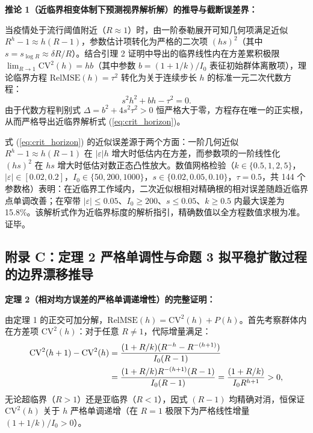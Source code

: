 \documentclass[11pt,a4paper]{article}
\theoremstyle{plain}
\theoremstyle{definition}
\begin{document}
\vspace{0.8em}
\noindent\textbf{推论 1（近临界相变体制下预测视界解析解）的推导与截断误差界：}

当疫情处于流行阈值附近（$R \approx 1$）时，由一阶泰勒展开可知几何项满足近似 $R^h - 1 \approx h(R-1)$，参数估计项转化为严格的二次项 $(h s)^2$（其中 $s = s_{\log R} \approx \delta R / R$）。结合引理 2 证明中导出的临界线性内在方差累积极限 $\lim_{R\to 1}\text{CV}^2(h) = h b$（其中参数 $b=(1+1/k)/I_0$ 表征初始群体离散项），理论临界方程 $\text{RelMSE}(h) = \tau^2$ 转化为关于连续步长 $h$ 的标准一元二次代数方程：
\begin{equation}
s^2 h^2 + b h - \tau^2 = 0.
\end{equation}
由于代数方程判别式 $\Delta = b^2 + 4 s^2 \tau^2 > 0$ 恒严格大于零，方程存在唯一的正实根，从而严格导出近临界解析式 (\ref{eq:crit_horizon})。

式 (\ref{eq:crit_horizon}) 的近似误差源于两个方面：一阶几何近似 $R^h - 1 \approx h(R-1)$ 在 $|\varepsilon| h$ 增大时低估内在方差，而参数项的一阶线性化 $(h s)^2$ 在 $h s$ 增大时低估对数正态凸性放大。数值网格检验（$k \in \{0.5, 1, 2, 5\}$，$|\varepsilon| \in [0.02, 0.2]$，$I_0 \in \{50, 200, 1000\}$，$s \in \{0.02, 0.05, 0.10\}$，$\tau = 0.5$，共 144 个参数格）表明：在近临界工作域内，二次近似根相对精确根的相对误差随趋近临界点单调改善；在窄带 $|\varepsilon| \le 0.05$、$I_0 \ge 200$、$s \le 0.05$、$k \ge 0.5$ 内最大误差为 15.8\%。该解析式作为近临界标度的解析指引，精确数值以全方程数值求根为准。
证毕。

\subsection*{附录 C：定理 2 严格单调性与命题 3 拟平稳扩散过程的边界漂移推导}

\noindent\textbf{定理 2（相对均方误差的严格单调递增性）的完整证明：}

由定理 1 的正交可加分解，$\text{RelMSE}(h) = \text{CV}^2(h) + P(h)$。首先考察群体内在方差项 $\text{CV}^2(h)$：对于任意 $R \neq 1$，代际增量满足：
\begin{align}
\text{CV}^2(h+1) - \text{CV}^2(h) &= \frac{(1+R/k)(R^{-h} - R^{-(h+1)})}{I_0(R-1)} \notag \\
&= \frac{(1+R/k) R^{-(h+1)}(R-1)}{I_0(R-1)} = \frac{(1+R/k)}{I_0 R^{h+1}} > 0,
\end{align}
无论超临界（$R > 1$）还是亚临界（$R < 1$），因式 $(R-1)$ 均精确对消，恒保证 $\text{CV}^2(h)$ 关于 $h$ 严格单调递增（在 $R=1$ 极限下为严格线性增量 $(1+1/k)/I_0 > 0$）。
\end{document}

